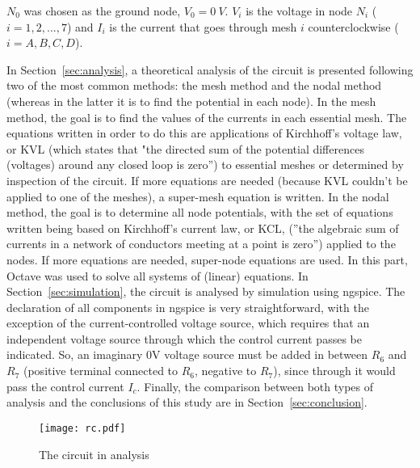 \par
$N_0$ was chosen as the ground node, $V_0 = 0 \ V$. $V_i$ is the voltage in node $N_i$ ($i=1, 2, ..., 7$) and $I_i$  is the current that goes through mesh $i$ counterclockwise ($i=A, B, C, D$).


\par
In Section~\ref{sec:analysis}, a theoretical analysis of the circuit is presented following two of the most common methods: the mesh method and the nodal method (whereas in the latter it is to find the potential in each node). In the mesh method, the goal is to find the values of the currents in each essential mesh. The equations written in order to do this are applications of Kirchhoff's voltage law, or KVL (which states that "the directed sum of the potential differences (voltages) around any closed loop is zero'') to essential meshes or determined by inspection of the circuit. If more equations are needed (because KVL couldn't be applied to one of the meshes), a super-mesh equation is written. In the nodal method, the goal is to determine all node potentials, with the set of equations written being based on Kirchhoff's current law, or KCL, (''the algebraic sum of currents in a network of conductors meeting at a point is zero'') applied to the nodes. If more equations are needed, super-node equations are used. In this part, Octave was used to solve all systems of (linear) equations. In Section~\ref{sec:simulation}, the circuit is analysed by simulation using ngspice. The declaration of all components in ngspice is very straightforward, with the exception of the current-controlled voltage source, which requires that an independent voltage source through which the control current passes be indicated. So, an imaginary 0V voltage source must be added in between $R_6$ and $R_7$ (positive terminal connected to $R_6$, negative to $R_7$), since through it would pass the control current $I_c$. Finally, the comparison between both types of analysis and the conclusions of this study are in Section~\ref{sec:conclusion}.

\begin{figure}[h] \centering
\texttt{[image: rc.pdf]}
\caption{The circuit in analysis}
\label{fig:rc}
\end{figure}
